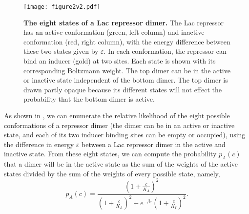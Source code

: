 \begin{figure}[h]
	\centering \texttt{[image: figure2v2.pdf]}
	\caption{{\bf The eight states of a Lac repressor dimer.}  The Lac repressor has
		an active conformation (green, left column) and inactive conformation (red,
		right column), with the energy difference between these two states given by
		$\varepsilon$. In each conformation, the repressor can bind an inducer (gold) at
		two sites. Each state is shown with its corresponding Boltzmann weight. The top
		dimer can be in the active or inactive state independent of the bottom dimer.
		The top dimer is drawn partly opaque because its different states will not
		effect the probability that the bottom dimer is active. %
	} \label{figrepressorInducerStates}
\end{figure}

As shown in \fref[figrepressorInducerStates], we can enumerate the relative
likelihood of the eight possible conformations of a repressor dimer (the dimer
can be in an active or inactive state, and each of its two inducer binding sites
can be empty or occupied), using the difference in energy $\varepsilon$ between a
Lac repressor dimer in the active and inactive state. From these eight states, we can
compute the probability \(p_A(c)\) that a dimer will be in the active state
as the sum of the weights of the active states divided by the sum of the weights
of every possible state, namely,
\begin{equation}\label{eq6}
p_A(c)=\frac{\left(1+\frac{c}{K_A}\right)^2}{\left(1+\frac{c}{K_A}\right)^2+e^{-\beta  \varepsilon }\left(1+\frac{c}{K_I}\right)^2}.
\end{equation}


